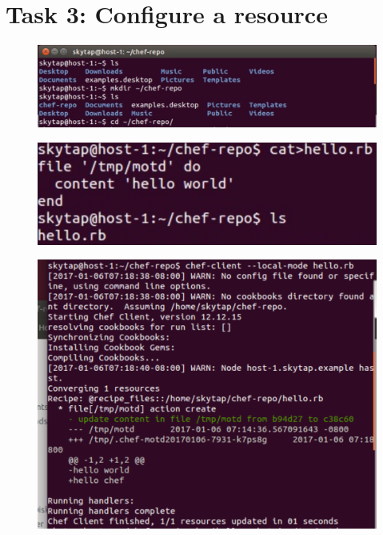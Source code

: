 \documentclass[12pt,letterpaper,boxed]{hmcpset}
\begin{document}
\section*{Task 3: Configure a resource}
\begin{figure}[H]
  \centering
  \includegraphics[width = 1.0\textwidth]{1.png}
\end{figure}
\begin{figure}[H]
  \centering
  \includegraphics[width = 1.0\textwidth]{2.png}
\end{figure}
\begin{figure}[H]
  \centering
  \includegraphics[width = 1.0\textwidth]{3.png}
\end{figure}
\end{document}
